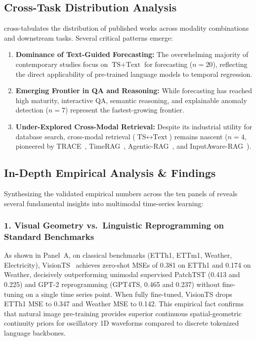 \subsection{Cross-Task Distribution Analysis}
 cross-tabulates the distribution of published works across modality combinations and downstream tasks. Several critical patterns emerge:
\begin{enumerate}
    \item \textbf{Dominance of Text-Guided Forecasting:} The overwhelming majority of contemporary studies focus on $\text{TS} + \text{Text}$ for forecasting ($n=20$), reflecting the direct applicability of pre-trained language models to temporal regression.
    \item \textbf{Emerging Frontier in QA and Reasoning:} While forecasting has reached high maturity, interactive QA, semantic reasoning, and explainable anomaly detection ($n=7$) represent the fastest-growing frontier.
    \item \textbf{Under-Explored Cross-Modal Retrieval:} Despite its industrial utility for database search, cross-modal retrieval ($\text{TS} \leftrightarrow \text{Text}$) remains nascent ($n=4$, pioneered by TRACE~\cite{Chen2025TRACE}, TimeRAG~\cite{Yang2024TimeRAG}, Agentic-RAG~\cite{Ravuru2024AgenticRAG}, and InputAware-RAG~\cite{Lee2026RAG}).
\end{enumerate}

\subsection{In-Depth Empirical Analysis \& Findings}
Synthesizing the validated empirical numbers across the ten panels of  reveals several fundamental insights into multimodal time-series learning:

\subsubsection{1. Visual Geometry vs.\ Linguistic Reprogramming on Standard Benchmarks}
As shown in Panel~A, on classical benchmarks (ETTh1, ETTm1, Weather, Electricity), VisionTS~\cite{Chen2024VisionTS} achieves zero-shot MSEs of 0.381 on ETTh1 and 0.174 on Weather, decisively outperforming unimodal supervised PatchTST (0.413 and 0.225) and GPT-2 reprogramming (GPT4TS, 0.465 and 0.237) without fine-tuning on a single time series point. When fully fine-tuned, VisionTS drops ETTh1 MSE to 0.347 and Weather MSE to 0.142. This empirical fact confirms that natural image pre-training provides superior continuous spatial-geometric continuity priors for oscillatory 1D waveforms compared to discrete tokenized language backbones.

